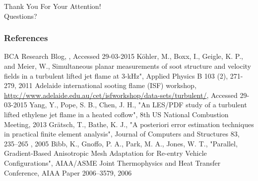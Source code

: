 \documentclass{beamer}
\begin{document}
\begin{frame}
\begin{center}
{\huge Thank You For Your Attention!} \\
\vspace*{1.5cm}
{\Large Questions?}
\end{center}
\end{frame}

\appendix
{}
\setcounter{finalframe}{\value{framenumber}}

\begin{frame}
\frametitle{References}

\begin{minipage}[t][1\textheight]{1\textwidth}
\vspace{-20pt}
\begin{exampleblock}{}

\begin{tiny}

\begin{thebibliography}{1} %
\beamertemplatetextbibitems
{}
BCA Research Blog, , Accessed 29-03-2015
K{\"o}hler, M., Boxx, I., Geigle, K. P., and Meier, W., \newblock Simultaneous planar measurements of soot structure and velocity fields in a turbulent lifted jet flame at 3-kHz", Applied Physics B 103 (2), 271-279, 2011  
Adelaide international sooting flame (ISF) workshop, \newblock \url{http://www.adelaide.edu.au/cet/isfworkshop/data-sets/turbulent/}, Accessed 29-03-2015
Yang, Y., Pope, S. B., Chen, J. H., \newblock "An LES/PDF study of a turbulent lifted ethylene jet flame in a heated coflow", 8th US National Combustion Meeting, 2013
Gr{\"a}tsch, T., Bathe, K. J., \newblock "A posteriori error estimation techniques in practical finite element analysis", Journal of Computers and Structures 83, 235–265 , 2005 
Bibb, K., Gnoffo, P. A., Park, M. A., Jones, W. T., \newblock "Parallel, Gradient-Based Anisotropic Mesh Adaptation for Re-entry Vehicle Configurations",  AIAA/ASME Joint Thermophysics and Heat Transfer Conference, AIAA Paper 2006–3579, 2006 

\end{thebibliography}
\end{tiny}

\end{exampleblock}
\end{minipage}


\end{frame}

\setcounter{framenumber}{\value{finalframe}}
\end{document}

